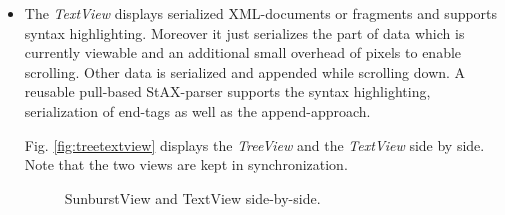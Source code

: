 \begin{itemize}
\item
The \emph{TextView} displays serialized XML-documents or fragments and supports syntax highlighting. Moreover it just serializes the part of data which is currently viewable and an additional small overhead of pixels to enable scrolling. Other data is serialized and appended while scrolling down. A reusable pull-based StAX-parser supports the syntax highlighting, serialization of end-tags as well as the append-approach.%

Fig. \ref{fig:treetextview} displays the \emph{TreeView} and the \emph{TextView} side by side. Note that the two views are kept in synchronization.

\begin{figure}[tb]
\caption{\label{fig:sunbursttextview} SunburstView and TextView side-by-side.}
\end{figure}


\end{itemize}

